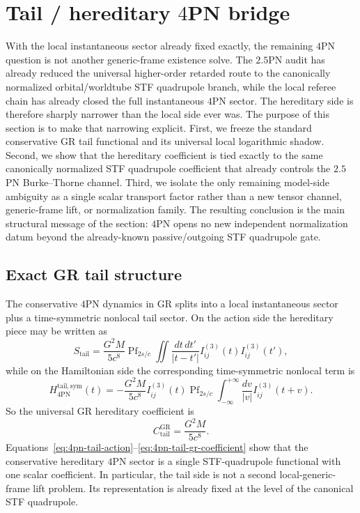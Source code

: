 \documentclass[11pt]{article}
\begin{document}

\section{Tail / hereditary \texorpdfstring{$4$}{4}PN bridge}
\label{sec:tail-bridge}

With the local instantaneous sector already fixed exactly, the remaining $4$PN
question is not another generic-frame existence solve.  The $2.5$PN audit has
already reduced the universal higher-order retarded route to the canonically
normalized orbital/worldtube STF quadrupole branch, while the local referee
chain has already closed the full instantaneous $4$PN sector.  The hereditary
side is therefore sharply narrower than the local side ever was.  The purpose of
this section is to make that narrowing explicit.  First, we freeze the standard
conservative GR tail functional and its universal local logarithmic shadow.
Second, we show that the hereditary coefficient is tied exactly to the same
canonically normalized STF quadrupole coefficient that already controls the
$2.5$PN Burke--Thorne channel.  Third, we isolate the only remaining model-side
ambiguity as a single scalar transport factor rather than a new tensor channel,
generic-frame lift, or normalization family.  The resulting conclusion is the
main structural message of the section: $4$PN opens no new independent
normalization datum beyond the already-known passive/outgoing STF quadrupole
gate.

\subsection{Exact GR tail structure}
\label{sec:tail-gr-structure}

The conservative $4$PN dynamics in GR splits into a local instantaneous sector
plus a time-symmetric nonlocal tail sector.  On the action side the hereditary
piece may be written as
\begin{equation}
S_{\mathrm{tail}}
=
\frac{G^2 M}{5c^8}
\operatorname{Pf}_{2s/c}
\iint \frac{dt\,dt'}{|t-t'|}
I_{ij}^{(3)}(t)
I_{ij}^{(3)}(t'),
\label{eq:4pn-tail-action}
\end{equation}
while on the Hamiltonian side the corresponding time-symmetric nonlocal term is
\begin{equation}
H_{4\mathrm{PN}}^{\mathrm{tail,sym}}(t)
=
-
\frac{G^2 M}{5c^8}
I_{ij}^{(3)}(t)
\operatorname{Pf}_{2s/c}
\int_{-\infty}^{+\infty}
\frac{dv}{|v|}
I_{ij}^{(3)}(t+v).
\label{eq:4pn-tail-hamiltonian}
\end{equation}
So the universal GR hereditary coefficient is
\begin{equation}
C_{\mathrm{tail}}^{\mathrm{GR}}
=
\frac{G^2 M}{5c^8}.
\label{eq:4pn-tail-gr-coefficient}
\end{equation}
Equations~\eqref{eq:4pn-tail-action}--\eqref{eq:4pn-tail-gr-coefficient}
show that the conservative hereditary $4$PN sector is a single STF-quadrupole
functional with one scalar coefficient.  In particular, the tail side is not a
second local-generic-frame lift problem.  Its representation is already fixed at
the level of the canonical STF quadrupole.
\end{document}

